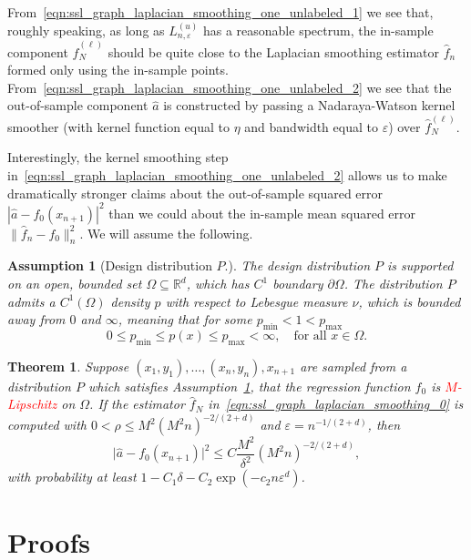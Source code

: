\documentclass{article}
\newcommand{\Reals}{\mathbb{R}}
\newcommand{\1}{\mathbf{1}}
\newcommand{\Rd}{\Reals^d}
\newcommand{\wh}[1]{\widehat{#1}}
\theoremstyle{alden}
\theoremstyle{aldenthm}
\newtheorem{theorem}{Theorem}
\newtheorem{assumption}{Assumption}
\theoremstyle{definition}
\theoremstyle{remark}
\begin{document}
From~\eqref{eqn:ssl_graph_laplacian_smoothing_one_unlabeled_1} we see that, roughly speaking, as long as $L_{n,\varepsilon}^{(u)}$ has a reasonable spectrum, the in-sample component $\wh{f}_N^{(\ell)}$ should be quite close to the Laplacian smoothing estimator $\wh{f}_n$ formed only using the in-sample points. From~\eqref{eqn:ssl_graph_laplacian_smoothing_one_unlabeled_2} we see that the out-of-sample component $\wh{a}$ is constructed by passing a Nadaraya-Watson kernel smoother (with kernel function equal to $\eta$ and bandwidth equal to $\varepsilon$) over $\wh{f}_N^{(\ell)}$.

Interestingly, the kernel smoothing step in~\eqref{eqn:ssl_graph_laplacian_smoothing_one_unlabeled_2} allows us to make dramatically stronger claims about the out-of-sample squared error $|\wh{a} - f_0(x_{n + 1})|^2$ than we could about the in-sample mean squared error $\|\wh{f}_n - f_0\|_n^2$. We will assume the following.
\begin{assumption}[Design distribution $P$.]
	\label{asmp:design2}
	The design distribution $P$ is supported on an open, bounded set $\Omega \subseteq \Rd$, which has $C^{1}$ boundary $\partial \Omega$. The distribution $P$ admits a $C^{1}(\Omega)$ density $p$ with respect to Lebesgue measure $\nu$, which is bounded away from $0$ and $\infty$, meaning that for some $p_{\min} < 1 < p_{\max}$
	\begin{equation*}
	0 \leq p_{\min} \leq p(x) \leq p_{\max} < \infty,\quad\textrm{for all $x \in \Omega$.}
	\end{equation*}
\end{assumption}  
\begin{theorem}
	\label{thm:out_of_sample_laplacian_regularization}
	Suppose $(x_1,y_1),\ldots,(x_n,y_n),x_{n + 1}$ are sampled from a distribution $P$ which satisfies Assumption~\ref{asmp:design2}, that the regression function $f_0$ is \textcolor{red}{$M$-Lipschitz} on $\Omega$. If the estimator $\wh{f}_N$ in~\eqref{eqn:ssl_graph_laplacian_smoothing_0} is computed with $0 < \rho \leq M^2(M^2n)^{-2/(2 + d)}$ and $\varepsilon = n^{-1/(2 + d)}$, then 
	\begin{equation*}
	\bigl|\wh{a} - f_0(x_{n + 1})\bigr|^2 \leq C\frac{M^2}{\delta^2}(M^2n)^{-2/(2 + d)},
	\end{equation*}
	with probability at least $1 - C_1\delta - C_2\exp(-c_2n\varepsilon^d)$.
\end{theorem}



\section{Proofs}
\end{document}
